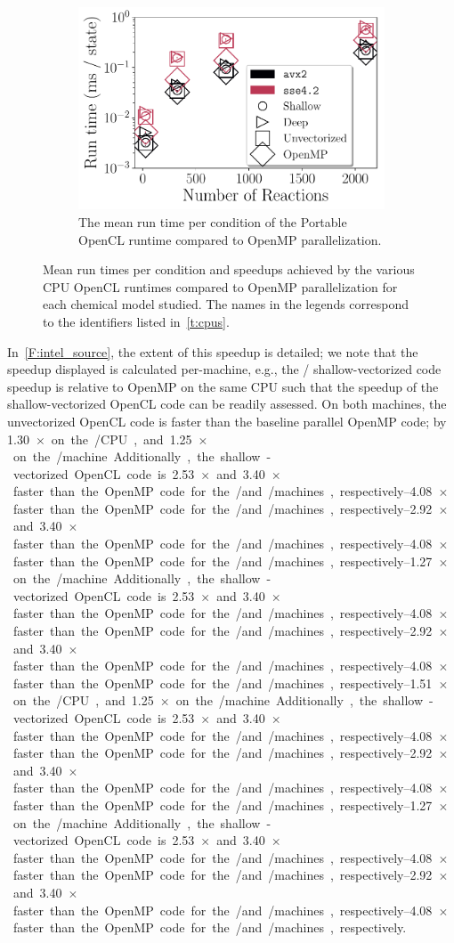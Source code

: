 \documentclass[12pt,number,sort&compress,preprint]{elsarticle}
\begin{document}
\begin{figure}[htbp]
\begin{subfigure}[t]{0.48\linewidth}
      \includegraphics[width=\textwidth]{pocl_source_nonorm.pdf}
      \caption{The mean run time per condition of the Portable OpenCL runtime compared to OpenMP parallelization.}
      \label{F:pocl_source}
  \end{subfigure}
 \caption{Mean run times per condition and speedups achieved by the various CPU OpenCL runtimes compared to OpenMP parallelization for each chemical model studied. The names in the legends correspond to the identifiers listed in~\cref{t:cpus}.}
 \label{F:cpu_source}
\end{figure}

In~\cref{F:intel_source}, the extent of this speedup is detailed; we note that the speedup displayed is calculated per-machine, e.g., the \avx/ shallow-vectorized code speedup is relative to OpenMP on the same CPU such that the speedup of the shallow-vectorized OpenCL code can be readily assessed.
On both machines, the unvectorized OpenCL code is faster than the baseline parallel OpenMP code; by \SIrange{1.30}{1.51}{$\times$} on the \avx/ CPU, and \SIrange{1.25}{1.27}{$\times$} on the \sse/ machine.
Additionally, the shallow-vectorized OpenCL code is \SIrange{2.53}{2.92}{$\times$} and \SIrange{3.40}{4.08}{$\times$} faster than the OpenMP code for the \sse/ and \avx/ machines, respectively.
\end{document}
